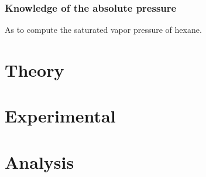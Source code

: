 \documentclass[11pt, rgb]{scrreprt}
\begin{document}
        \subsection{Knowledge of the absolute pressure}
            As to compute the saturated vapor pressure of hexane.


\chapter{Theory}
\label{cha:theory}


    
    
    
    
    
    
    


\chapter{Experimental}
\label{cha:experimental}

    
    

\chapter{Analysis}
\label{cha:analysis}

    
    


\end{document}
